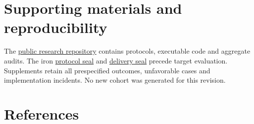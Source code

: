 \documentclass[sigconf,review]{acmart}
\begin{document}
\section*{Supporting materials and reproducibility}

The \href{https://github.com/ziwang11112/evidence-guided-virtual-cohorts-2026}{public research repository} contains protocols, executable code and aggregate audits. The iron \href{https://github.com/ziwang11112/evidence-guided-virtual-cohorts-2026/commit/bedd845768c1c938768f58fce685f53cbf97f3df}{protocol seal} and \href{https://github.com/ziwang11112/evidence-guided-virtual-cohorts-2026/commit/c88192edeb0bc63b60d0bfe6e3a7282ced9d2975}{delivery seal} precede target evaluation. Supplements retain all prespecified outcomes, unfavorable cases and implementation incidents. No new cohort was generated for this revision.


\clearpage

\section*{References}

\begingroup
\end{document}
